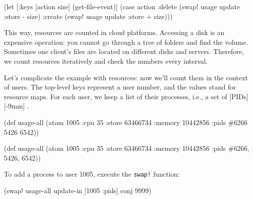 \else

\begin{english}
  \begin{clojure}
(let [{:keys [action size]} (get-file-event)]
  (case action
    :delete
    (swap! usage update :store - size)
    :create
    (swap! usage update :store + size)))
  \end{clojure}
\end{english}

\fi


This way, resources are counted in cloud platforms.
Accessing a disk is an expensive operation: you cannot go through a tree of folders and find the volume.
Sometimes one client's files are located on different disks and servers. Therefore, we count resources iteratively and check the numbers every interval.


Let's complicate the example with resources: now we'll count them in the context of users.
The top-level keys represent a user number, and the values stand for resource maps.
For each user, we keep a list of their processes, i.e., a set of [PIDs][-9mm]
.

\ifx\DEVICETYPE\MOBILE
\begin{english}
  \begin{clojure/lines}
(def usage-all
  (atom {1005 {:cpu 35
               :store 63466734
               :memory 10442856
               :pids #{6266 5426
                       6542}}}))
  \end{clojure/lines}
\end{english}

\else

\begin{english}
  \begin{clojure/lines}
(def usage-all
  (atom {1005 {:cpu 35
               :store 63466734
               :memory 10442856
               :pids #{6266, 5426, 6542}}}))
  \end{clojure/lines}
\end{english}
\fi

To add a process to user 1005, execute the \verb|swap!| function:

\ifx\DEVICETYPE\MOBILE

\begin{english}
  \begin{clojure}
(swap! usage-all
  update-in [1005 :pids] conj 9999)
  \end{clojure}
\end{english}

